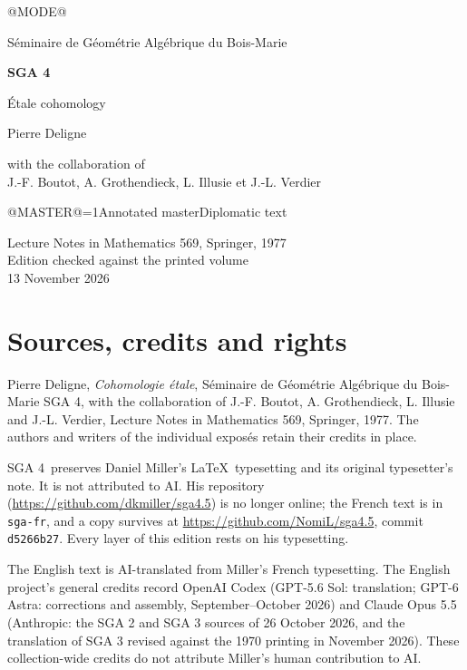 \documentclass[oneside]{book}
\makeatletter
\theoremstyle{sga-source}
\theoremstyle{sga-source-dash}
\theoremstyle{sga-source-dotdash}
\theoremstyle{sga-source-number-note-dash}
\theoremstyle{sga-source-note-number-dotdash}
\theoremstyle{sga-source-example-dotdash}
\theoremstyle{sga-source-inline-number}
\theoremstyle{sga-source-bare-number}
\theoremstyle{sga-source}
\providecommand\EditionMode{@MODE@}
\providecommand\EditionIsMaster{@MASTER@}
\makeatother
\begin{document}
\hypersetup{pageanchor=false}
\ifcase\EditionMode

\begin{titlepage}
\centering
\vspace*{2cm}
{\Large Séminaire de Géométrie Algébrique du Bois-Marie\par}
\vspace{0.7cm}
{\Huge\bfseries SGA 4\textonehalf\par}
\vspace{0.8cm}
{\huge Étale cohomology\par}
\vspace{1cm}
{\Large Pierre Deligne\par}
\vspace{0.5cm}
with the collaboration of\\[0.3em]
J.-F. Boutot, A. Grothendieck, L. Illusie et J.-L. Verdier
\vfill
{\Large \ifnum\EditionIsMaster=1\relax Annotated master\else Diplomatic text\fi\par}
\vspace{0.7cm}
Lecture Notes in Mathematics 569, Springer, 1977\\[0.4em]
Edition checked against the printed volume\\
13 November 2026
\end{titlepage}

\chapter*{Sources, credits and rights}
Pierre Deligne, \emph{Cohomologie étale}, Séminaire de Géométrie Algébrique
du Bois-Marie SGA 4\textonehalf, with the collaboration of J.-F. Boutot,
A. Grothendieck, L. Illusie and J.-L. Verdier, Lecture Notes in Mathematics
569, Springer, 1977. The authors and writers of the individual exposés
retain their credits in place.

\medskip
SGA 4\textonehalf\ preserves Daniel Miller’s \LaTeX\ typesetting and its
original typesetter’s note. It is not attributed to AI. His repository
(\url{https://github.com/dkmiller/sga4.5}) is no longer online; the French
text is in \texttt{sga-fr}, and a copy survives at
\url{https://github.com/NomiL/sga4.5}, commit \texttt{d5266b27}.
Every layer of this edition rests on his typesetting.

\medskip
The English text is AI-translated from Miller’s French typesetting.
The English project’s general credits record OpenAI Codex (GPT-5.6 Sol:
translation; GPT-6 Astra: corrections and assembly, September--October
2026) and Claude Opus 5.5 (Anthropic: the SGA 2 and SGA 3 sources of
26 October 2026, and the translation of SGA 3 revised against the 1970
printing in November 2026). These collection-wide credits do not attribute
Miller’s human contribution to AI.
\end{document}
